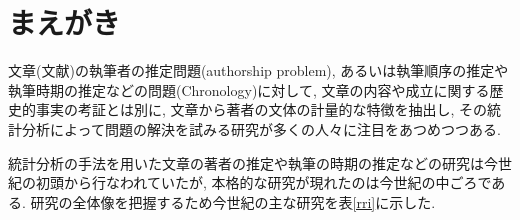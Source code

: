 

\maketitle




\section{まえがき}
文章(文献)の執筆者の推定問題(authorship problem), あるいは執筆順序の推定や執筆時期の推定などの問題(Chronology)に対して, 文章の内容や成立に関する歴史的事実の考証とは別に, 文章から著者の文体の計量的な特徴を抽出し, その統計分析によって問題の解決を試みる研究が多くの人々に注目をあつめつつある. 

統計分析の手法を用いた文章の著者の推定や執筆の時期の推定などの研究は今世紀の初頭から行なわれていたが, 本格的な研究が現れたのは今世紀の中ごろである. 研究の全体像を把握するため今世紀の主な研究を表\ref{rri}に示した. 


